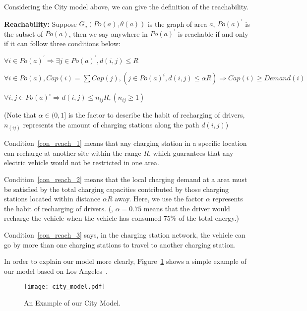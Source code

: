Considering the City model above, we can give the definition of the reachability.
\begin{definition}
\label{def_reachability}
\textbf{Reachability:}
Suppose $G_{a}(Po(a),\theta(a))$ is the graph of area $a$,
$Po(a)^{'}$ is the subset of $Po(a)$,
then we say anywhere in $Po(a)^{'}$ is reachable if and only if it can follow three conditions below:
\begin{condition}
\label{con_reach_1}
$\forall i \in Po(a)^{'} \Rightarrow \exists j \in Po(a)^{'},  d(i, j) \leqslant R$
\end{condition}
\begin{condition}
\label{con_reach_2}
$\forall i \in Po(a), Cap(i) = \sum{Cap(j)}, (j \in Po(a)^{i}, d(i, j) \leqslant \alpha{R}) \Rightarrow Cap(i) \geqslant Demand(i)$
\end{condition}
\begin{condition}
\label{con_reach_3}
$\forall i, j \in Po(a)^{i} \Rightarrow d(i, j)  \leqslant n_{ij}R, (n_{ij} \geqslant 1)$
\end{condition}
(Note that $\alpha \in (0,1]$ is the factor to describe the habit of recharging of drivers,
 $n_(ij)$ represents the amount of charging stations along the path $d(i, j)$)
\end{definition}

Condition~\ref{con_reach_1} means that any charging station in a specific location can recharge at another site within the range $R$,
which guarantees that any electric vehicle would not be restricted in one area.

Condition~\ref{con_reach_2} means that the local charging demand at a area must be satisfied by the total charging capacities contributed by those charging stations located within distance $\alpha{R}$ away.
Here, we use the factor $\alpha$ represents the habit of recharging of drivers.
(\eg, $\alpha = 0.75$ means that the driver would recharge the vehicle when the vehicle has consumed $75\%$ of the total energy.)

Condition~\ref{con_reach_3} says, in the charging station network, the vehicle can go by more than one charging stations to travel to another charging station.

In order to explain our model more clearly,
Figure~\ref{fig_city_model} shows a simple example of our model based on Los Angeles~\cite{LAMap}.


\begin{figure}[!t]
\centering
\texttt{[image: city\_model.pdf]}
\caption{An Example of our City Model.}
\label{fig_city_model}
\end{figure}


